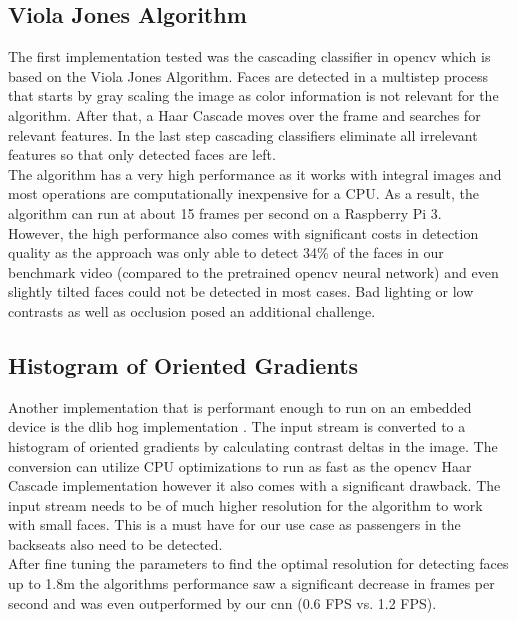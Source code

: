 \subsection{Viola Jones Algorithm}
The first implementation tested was the cascading classifier in \gls{opencv} which is based on the Viola Jones Algorithm. Faces are detected in a multistep process that starts by gray scaling the image as color information is not relevant for the algorithm. After that, a Haar Cascade moves over the frame and searches for relevant features. In the last step cascading classifiers eliminate all irrelevant features so that only detected faces are left.\\
The algorithm has a very high performance as it works with integral images and most operations are computationally inexpensive for a CPU. As a result, the algorithm can run at about 15 frames per second on a Raspberry Pi 3.\\%
However, the high performance also comes with significant costs in detection quality as the approach was only able to detect 34\% of the faces in our benchmark video (compared to the pretrained \gls{opencv} neural network) and even slightly tilted faces could not be detected in most cases. Bad lighting or low contrasts as well as occlusion posed an additional challenge.
\subsection{Histogram of Oriented Gradients}
Another implementation that is performant enough to run on an embedded device is the \gls{dlib} \gls{hog} implementation \cite{HoGpaper}. The input stream is converted to a histogram of oriented gradients by calculating contrast deltas in the image. The conversion can utilize CPU optimizations to run as fast as the \gls{opencv} Haar Cascade implementation however it also comes with a significant drawback. The input stream needs to be of much higher resolution for the algorithm to work with small faces. This is a must have for our use case as passengers in the backseats also need to be detected.\\
After fine tuning the parameters to find the optimal resolution for detecting faces up to 1.8m the algorithms performance saw a significant decrease in frames per second and was even outperformed by our \gls{cnn} (0.6 FPS vs. 1.2 FPS).
